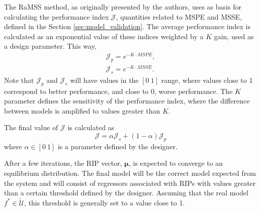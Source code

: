 The RaMSS method, as originally presented by the authors, uses as basis for calculating the performance index $\mathcal{J}$, quantities related to MSPE and MSSE, defined in the Section \ref{sec:model_validation}. The average performance index is calculated as an exponential value of these indices weighted by a $K$ gain, used as a design parameter. This way,
\begin{align}
  \mathcal{J}_p = e^{-K\cdot MSPE}, \label{eq:Jp} \\
  \mathcal{J}_s = e^{-K\cdot MSSE}. \label{eq:Js}
\end{align}
Note that $\mathcal{J}_p$ and $\mathcal{J}_s$ will have values in the $[0 \ 1]$ range, where values close to 1 correspond to better performance, and close to 0, worse performance. The $K$ parameter defines the sensitivity of the performance index, where the difference between models is amplified to values greater than $K$.

The final value of $\mathcal{J}$ is calculated as
\begin{equation}
  \mathcal{J} = \alpha \mathcal{J}_s + (1-\alpha)\mathcal{J}_p
\label{eq:Jcal}
\end{equation}
where $\alpha \in [0 \ 1]$ is a parameter defined by the designer. 



After a few iterations, the RIP vector, $\bm{\mu}$, is expected to converge to an equilibrium distribution. The final model will be the correct model expected from the system and will consist of regressors associated with RIPs with values greater than a certain threshold defined by the designer. Assuming that the real model $f^* \in \tilde{\mathscr{U}}$, this threshold is generally set to a value close to 1.

